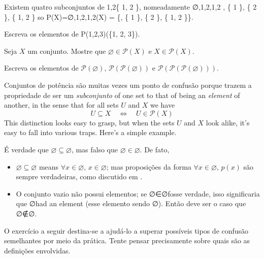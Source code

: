\begin{example}
Existem quatro subconjuntos de {1,2}\{ 1, 2 \}, nomeadamente
∅,{1},{2},{1,2} \varnothing, \quad \{ 1 \}, \quad \{ 2 \}, \quad \{ 1, 2 \} 
so P(X)={∅,{1},{2},{1,2}}(X) = \{\varnothing, \{ 1 \}, \{ 2 \}, \{ 1, 2 \}\}.
\end{example}

\begin{exercise}
Escreva os elementos de P({1,2,3})(\{1, 2, 3\}).
\end{exercise}

\begin{exercise}
Seja $X$ um conjunto. Mostre que $\varnothing \in \mathcal{P}(X)$ e $X \in \mathcal{P}(X)$.
\end{exercise}

\begin{exercise}
Escreva os elementos de $\mathcal{P}(\varnothing)$, $\mathcal{P}(\mathcal{P}(\varnothing))$ e $\mathcal{P}(\mathcal{P}(\mathcal{P}(\varnothing)))$.
\end{exercise}

Conjuntos de potência são muitas vezes um ponto de confusão porque trazem a propriedade de ser um \textit{subconjunto} of one set to that of being an \textit{element} of another, in the sense that for all sets $U$ and $X$ we have
\[ U \subseteq X \quad \Leftrightarrow \quad U \in \mathcal{P}(X) \]
This distinction looks easy to grasp, but when the sets $U$ and $X$ look alike, it's easy to fall into various traps. Here's a simple example.

\begin{example}
É verdade que $\varnothing \subseteq \varnothing$, mas falso que $\varnothing \in \varnothing$. De fato,
\begin{itemize}
\item $\varnothing \subseteq \varnothing$ means $\forall x \in \varnothing,\, x \in \varnothing$; mas proposições da forma $\forall x \in \varnothing,\, p(x)$ são sempre verdadeiras, como discutido em .
\item O conjunto vazio não possui elementos; se ∅∈∅\varnothing \in \varnothing fosse verdade, isso significaria que ∅\varnothing had an element (esse elemento sendo ∅\varnothing). Então deve ser o caso que ∅∉∅\varnothing \not \in \varnothing.
\end{itemize}
\end{example}

O exercício a seguir destina-se a ajudá-lo a superar possíveis tipos de confusão semelhantes por meio da prática. Tente pensar precisamente sobre quais são as definições envolvidas.

